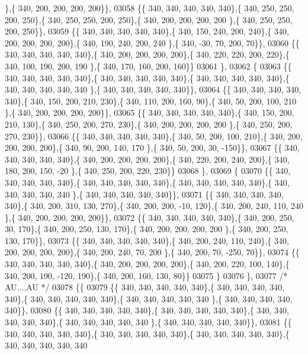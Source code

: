 \begin{DoxyCode}
      \},\{ 340, 200, 200, 200, 200\}\},
03058 \{\{ 340, 340, 340, 340, 340\},\{ 340, 250, 250, 200, 250\},\{ 340, 250, 250, 200, 250\},\{ 340, 200, 200, 200, 200
      \},\{ 340, 250, 250, 200, 250\}\},
03059 \{\{ 340, 340, 340, 340, 340\},\{ 340, 150, 240, 200, 240\},\{ 340, 200, 200, 200, 200\},\{ 340, 190, 240, 200, 240
      \},\{ 340, -30,  70, 200,  70\}\},
03060 \{\{ 340, 340, 340, 340, 340\},\{ 340, 200, 200, 200, 200\},\{ 340, 220, 220, 200, 220\},\{ 340, 100, 190, 200, 190
      \},\{ 340, 170, 160, 200, 160\}\}
03061 \},
03062 \{
03063 \{\{ 340, 340, 340, 340, 340\},\{ 340, 340, 340, 340, 340\},\{ 340, 340, 340, 340, 340\},\{ 340, 340, 340, 340, 340
      \},\{ 340, 340, 340, 340, 340\}\},
03064 \{\{ 340, 340, 340, 340, 340\},\{ 340, 150, 200, 210, 230\},\{ 340, 110, 200, 160,  90\},\{ 340,  50, 200, 100, 210
      \},\{ 340, 200, 200, 200, 200\}\},
03065 \{\{ 340, 340, 340, 340, 340\},\{ 340, 150, 200, 210, 130\},\{ 340, 250, 200, 270, 230\},\{ 340, 200, 200, 200, 200
      \},\{ 340, 250, 200, 270, 230\}\},
03066 \{\{ 340, 340, 340, 340, 340\},\{ 340,  50, 200, 100, 210\},\{ 340, 200, 200, 200, 200\},\{ 340,  90, 200, 140, 170
      \},\{ 340,  50, 200,  30, -150\}\},
03067 \{\{ 340, 340, 340, 340, 340\},\{ 340, 200, 200, 200, 200\},\{ 340, 220, 200, 240, 200\},\{ 340, 180, 200, 150, -20
      \},\{ 340, 250, 200, 220, 230\}\}
03068 \},
03069 \{
03070 \{\{ 340, 340, 340, 340, 340\},\{ 340, 340, 340, 340, 340\},\{ 340, 340, 340, 340, 340\},\{ 340, 340, 340, 340, 340
      \},\{ 340, 340, 340, 340, 340\}\},
03071 \{\{ 340, 340, 340, 340, 340\},\{ 340, 200, 310, 130, 270\},\{ 340, 200, 200, -10, 120\},\{ 340, 200, 240, 110, 240
      \},\{ 340, 200, 200, 200, 200\}\},
03072 \{\{ 340, 340, 340, 340, 340\},\{ 340, 200, 250,  30, 170\},\{ 340, 200, 250, 130, 170\},\{ 340, 200, 200, 200, 200
      \},\{ 340, 200, 250, 130, 170\}\},
03073 \{\{ 340, 340, 340, 340, 340\},\{ 340, 200, 240, 110, 240\},\{ 340, 200, 200, 200, 200\},\{ 340, 200, 240,  70, 200
      \},\{ 340, 200,  70, -250,  70\}\},
03074 \{\{ 340, 340, 340, 340, 340\},\{ 340, 200, 200, 200, 200\},\{ 340, 200, 220, 100, 140\},\{ 340, 200, 190, -120, 
      190\},\{ 340, 200, 160, 130,  80\}\}
03075 \}
03076 \},
03077 \textcolor{comment}{/* AU....AU */}
03078 \{\{
03079 \{\{ 340, 340, 340, 340, 340\},\{ 340, 340, 340, 340, 340\},\{ 340, 340, 340, 340, 340\},\{ 340, 340, 340, 340, 340
      \},\{ 340, 340, 340, 340, 340\}\},
03080 \{\{ 340, 340, 340, 340, 340\},\{ 340, 340, 340, 340, 340\},\{ 340, 340, 340, 340, 340\},\{ 340, 340, 340, 340, 340
      \},\{ 340, 340, 340, 340, 340\}\},
03081 \{\{ 340, 340, 340, 340, 340\},\{ 340, 340, 340, 340, 340\},\{ 340, 340, 340, 340, 340\},\{ 340, 340, 340, 340, 340

\end{DoxyCode}
